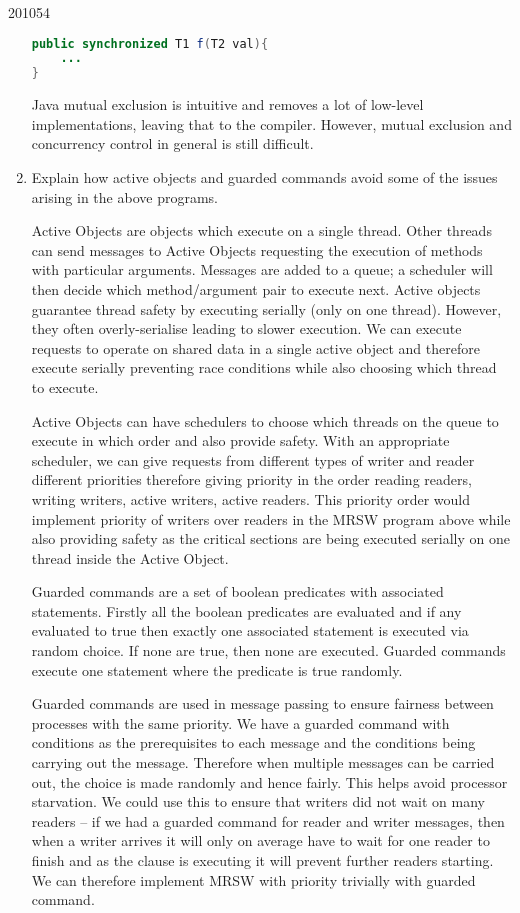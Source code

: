 \documentclass[10pt,\jkfside,a4paper]{article}
\begin{document}
\begin{examquestion}{2010}{5}{4}
\begin{enumerate}[label=(\alph*)]
\begin{lstlisting}[language=Java]
public synchronized T1 f(T2 val){
	...
}
\end{lstlisting}

Java mutual exclusion is intuitive and removes a lot of low-level
implementations, leaving that to the compiler. However, mutual exclusion and
concurrency control in general is still difficult.

\item Explain how active objects and guarded commands avoid some of the
issues arising in the above programs.

Active Objects are objects which execute on a single thread. Other
threads can send messages to Active Objects requesting the execution of
methods with particular arguments. Messages are added to a queue; a scheduler
will then decide which method/argument pair to execute next. Active objects
guarantee thread safety by executing serially (only on one thread). However,
they often overly-serialise leading to slower execution. We can execute
requests to operate on shared data in a single active object and therefore
execute serially preventing race conditions while also choosing which thread
to execute.

Active Objects can have schedulers to choose which threads on the queue to
execute in which order and also provide safety. With an appropriate
scheduler, we can give requests from different types of writer and reader
different priorities therefore giving priority in the order reading readers,
writing writers, active writers, active readers. This priority order would
implement priority of writers over readers in the MRSW program above while
also providing safety as the critical sections are being executed serially
on one thread inside the Active Object.

Guarded commands are a set of boolean predicates with associated statements.
Firstly all the boolean predicates are evaluated and if any evaluated to
true then exactly one associated statement is executed via random choice. If
none are true, then none are executed. Guarded commands execute one
statement where the predicate is true randomly.

Guarded commands are used in message passing to ensure fairness between
processes with the same priority. We have a guarded command with conditions
as the prerequisites to each message and the conditions being carrying out
the message. Therefore when multiple messages can be carried out, the choice
is made randomly and hence fairly. This helps avoid processor starvation. We
could use this to ensure that writers did not wait on many readers -- if we
had a guarded command for reader and writer messages, then when a writer
arrives it will only on average have to wait for one reader to finish and as
the clause is executing it will prevent further readers starting. We can
therefore implement MRSW with priority trivially with guarded command.


\end{enumerate}
\end{examquestion}
\end{document}
